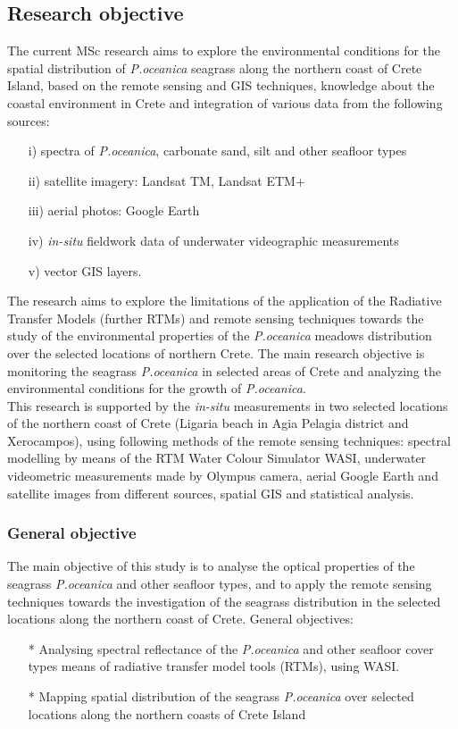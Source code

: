 \documentclass[10pt, a4paper]{article}
\begin{document}
\subsection{Research objective}
The current MSc research aims to explore the environmental conditions for the spatial distribution of \textit{P.oceanica} seagrass along the northern coast of Crete Island, based on the remote sensing and GIS techniques, knowledge about the coastal environment in Crete and integration of various data
from the following sources:
	\begin{itemize}
		\item[] i) spectra of \textit{P.oceanica}, carbonate sand, silt and other seafloor types
		\item[] ii) satellite imagery: Landsat TM, Landsat ETM+
		\item[] iii) aerial photos: Google Earth
		\item[] iv) \textit{in-situ} fieldwork data of underwater videographic measurements
		\item[] v) vector GIS layers.
	\end{itemize}
The research aims to explore the limitations of the application of the Radiative Transfer Models (further RTMs) and remote sensing techniques 
towards the study of the environmental properties of the \textit{P.oceanica} meadows distribution
over the selected locations of northern Crete. The main research objective is monitoring the seagrass \textit{P.oceanica} in selected areas of Crete and analyzing the environmental conditions for the growth of \textit{P.oceanica}. \\
This research is supported by the \textit{in-situ} measurements in two selected locations of the northern coast
of Crete (Ligaria beach in Agia Pelagia district and Xerocampos), using following methods of the
remote sensing techniques: spectral modelling by means of the RTM Water Colour Simulator WASI,  underwater videometric measurements made by Olympus camera, aerial Google Earth and satellite images from different sources, spatial GIS and statistical analysis.

\subsubsection{General objective}
The main objective of this study is to analyse the optical properties of the seagrass \textit{P.oceanica} and other seafloor types, and to apply the remote sensing techniques towards the investigation of the seagrass distribution in the selected locations along the northern coast of Crete.
General objectives:
	\begin{itemize}
		\item[*]Analysing spectral reflectance of the \textit{P.oceanica} and other seafloor cover types means of radiative transfer model tools (RTMs), using WASI.
		\item[*]Mapping spatial distribution of the seagrass \textit{P.oceanica} over selected locations along the northern coasts of Crete Island 
	\end{itemize}
\end{document}
